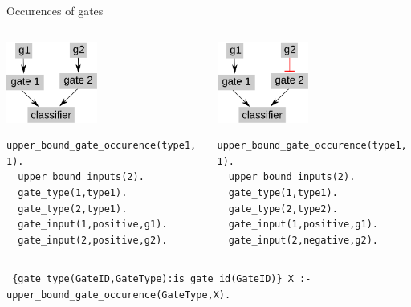 \documentclass[10pt,dvipsnames]{beamer}
\begin{document}
\begin{frame}[fragile]{Occurences of gates}
 \begin{columns}  
 \begin{column}{0.6\textwidth}
 \begin{center}\includegraphics[width=3cm]{constraints_05.png}\end{center}
 \color{my_example_color}
  \begin{Verbatim}[fontsize=\small]
  upper_bound_gate_occurence(type1, 1).
  upper_bound_inputs(2).
  gate_type(1,type1).
  gate_type(2,type1).
  gate_input(1,positive,g1).
  gate_input(2,positive,g2).
 \end{Verbatim}
 \end{column}
 \begin{column}{0.6\textwidth}
 \begin{center}\includegraphics[width=3cm]{constraints_06.png}\end{center}
 \color{my_example_color}
  \begin{Verbatim}[fontsize=\small]
  upper_bound_gate_occurence(type1, 1).
  upper_bound_inputs(2).
  gate_type(1,type1).
  gate_type(2,type2).
  gate_input(1,positive,g1).
  gate_input(2,negative,g2).
 \end{Verbatim}
 \end{column}
 \end{columns}
 \vspace{1cm}
 \texttt{
  \{gate\_type(GateID,GateType):{\color{gray}\;is\_gate\_id(GateID)}\} X :-\\
     \quad upper\_bound\_gate\_occurence(GateType,X).
 }
\end{frame}
 
\end{document}
